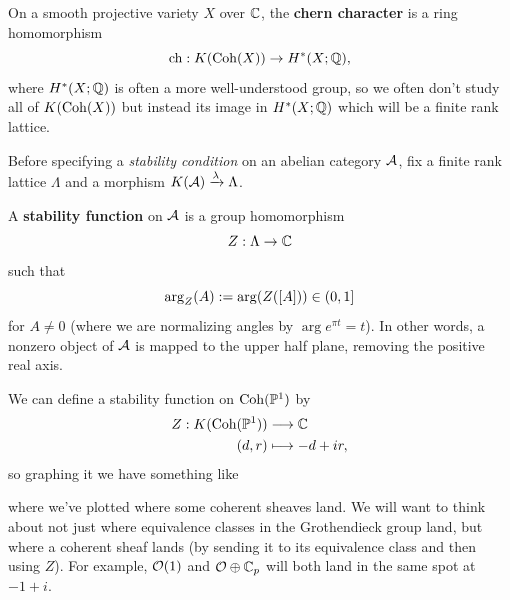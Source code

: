 \documentclass[12pt]{article}
\DeclareMathOperator{\chern}{ch}
\begin{document}
\begin{eg}
    On a smooth projective variety $X$ over $\mathbb{C}$, the \textbf{chern character} is a ring homomorphism
    \[\chern: K(\Coh(X)) \to H^*(X;\Q),\]
    where $H^*(X;\mathbb{Q})$ is often a more well-understood group, so we often don't study all of $K(\operatorname{Coh}(X))$ but instead its image in $H^*(X;\mathbb{Q})$ which will be a finite rank lattice.
\end{eg}

Before specifying a \textit{stability condition} on an abelian category $\mathcal{A}$, fix a finite rank lattice $\Lambda$ and a morphism $K(\mathcal{A})\xrightarrow{\lambda} \Lambda$.

\begin{defn}
    A \textbf{stability function} on $\mathcal{A}$ is a group homomorphism
    \[Z: \Lambda \to \mathbb{C}\]
    such that
    \[\arg_Z(A) := \arg(Z([A])) \in (0,1]\]
    for $A\neq 0$ (where we are normalizing angles by $\arg e^{\pi t} = t$). In other words, a nonzero object of $\mathcal{A}$ is mapped to the upper half plane, removing the positive real axis.
\end{defn}

\begin{eg}
    We can define a stability function on $\operatorname{Coh}(\mathbb{P}^1)$ by
    \begin{align*}
        Z: K(\operatorname{Coh}(\mathbb{P}^1)) &\longrightarrow \mathbb{C}\\
        (d,r) &\longmapsto -d + ir,
    \end{align*}
    so graphing it we have something like
    \begin{center}
    \end{center}
    where we've plotted where some coherent sheaves land. We will want to think about not just where equivalence classes in the Grothendieck group land, but where a coherent sheaf lands (by sending it to its equivalence class and then using $Z$). For example, $\mathcal{O}(1)$ and $\mathcal{O} \oplus \mathbb{C}_p$ will both land in the same spot at $-1+i$.
\end{eg}
\end{document}
